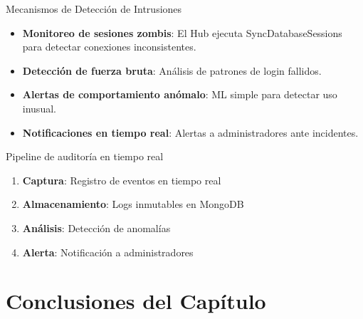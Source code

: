 \begin{caja}{Mecanismos de Detección de Intrusiones}
\begin{itemize}
\item \textbf{Monitoreo de sesiones zombis}: El Hub ejecuta SyncDatabaseSessions para detectar conexiones inconsistentes.
\item \textbf{Detección de fuerza bruta}: Análisis de patrones de login fallidos.
\item \textbf{Alertas de comportamiento anómalo}: ML simple para detectar uso inusual.
\item \textbf{Notificaciones en tiempo real}: Alertas a administradores ante incidentes.
\end{itemize}
\end{caja}

\begin{caja}{Pipeline de auditoría en tiempo real}
\begin{enumerate}
\item \textbf{Captura}: Registro de eventos en tiempo real
\item \textbf{Almacenamiento}: Logs inmutables en MongoDB
\item \textbf{Análisis}: Detección de anomalías
\item \textbf{Alerta}: Notificación a administradores
\end{enumerate}
\end{caja}

%
%

\newpage

\section{Conclusiones del Capítulo}

